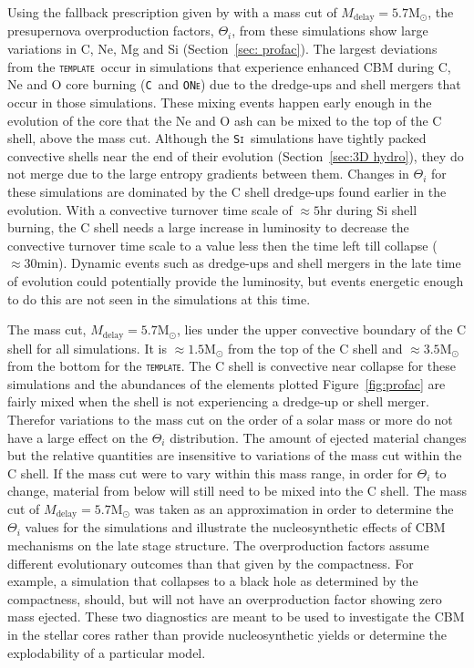 \documentclass[useAMS,usenatbib]{mn2e}
\newcommand{\Msun}{\ensuremath{\mathrm{M}_\odot}}
\newcommand{\template}{\textsc{\texttt{template}}}
\newcommand{\C}{\textsc{\texttt{C}}}
\newcommand{\ONe}{\textsc{\texttt{ONe}}}
\newcommand{\Si}{\textsc{\texttt{Si}}}
\begin{document}
Using the fallback prescription given by \citet{Fryer2012} with a mass cut of
$M_{\mathrm{delay}}=5.7\Msun$, the presupernova overproduction factors, $\Theta_{i}$, 
from these simulations show large variations in C, Ne, Mg and Si 
(Section~\ref{sec: profac}). The largest deviations from the \template\ occur 
in simulations that experience enhanced CBM during C, Ne and O core 
burning (\C\ and \ONe) due to the dredge-ups and shell mergers that occur 
in those simulations. These mixing events happen early enough in the 
evolution of the core that the Ne and O ash can be mixed to the top of the C 
shell, above the mass cut. Although the \Si\ simulations have tightly packed 
convective shells near the end of their evolution (Section~\ref{sec:3D hydro}), 
they do not merge due to the large entropy gradients between them. Changes 
in $\Theta_{i}$ for these simulations are dominated by the C shell dredge-ups 
found earlier in the evolution. With a convective turnover time scale of 
$\approx 5 \mathrm{hr}$ during Si shell burning, the C shell needs a 
large increase in luminosity to decrease the convective turnover time scale 
to a value less then the time left till collapse ($\approx 30 \mathrm{min}$). 
Dynamic events such as dredge-ups and shell mergers in the late time of 
evolution could potentially provide the luminosity, but events energetic 
enough to do this are not seen in the simulations at this time. 

The mass cut, $M_{\mathrm{delay}}=5.7\Msun$, lies under the upper 
convective boundary of the C shell for all simulations. It is 
$\approx 1.5 \mathrm{M}_{\odot}$ 
from the top of the C shell and $\approx 3.5 \mathrm{M}_{\odot}$ from the 
bottom for the \template. The C shell is convective near collapse for these 
simulations and 
the abundances of the elements plotted Figure~\ref{fig:profac} are fairly 
mixed when the shell is not experiencing a dredge-up or shell merger. 
Therefor variations to the mass cut on the order of a solar mass or more do 
not have a large effect on the $\Theta_{i}$ distribution. The amount of ejected 
material changes but the relative quantities are insensitive to variations of 
the mass cut within the C shell. If the mass cut were to vary within this mass 
range, in order for $\Theta_{i}$ to change, material from below will still need to 
be mixed into the C shell. The mass cut of $M_{\mathrm{delay}}=5.7\Msun$ 
was taken as an approximation in order to determine the $\Theta_{i}$ values for 
the simulations and illustrate the nucleosynthetic effects of CBM mechanisms 
on the late stage structure. The overproduction factors assume 
different evolutionary outcomes than that given by the compactness. For 
example, a simulation that collapses to a black hole as determined by the 
compactness, should, but will not have an overproduction 
factor showing zero mass ejected. These two diagnostics are meant to be 
used to investigate the CBM in the stellar cores rather than provide 
nucleosynthetic yields or determine the explodability of a particular model.  
\end{document}
